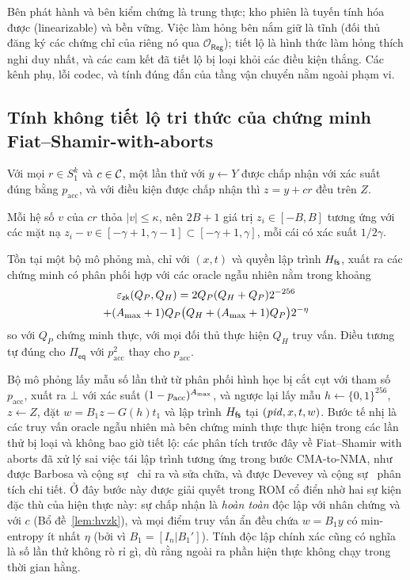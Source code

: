 Bên phát hành và bên kiểm chứng là trung thực; kho phiên là tuyến tính hóa được
(linearizable) và bền vững. Việc làm hỏng bên nắm giữ là tĩnh (đối thủ đăng ký
các chứng chỉ của riêng nó qua $\mathcal O_{\mathsf{Reg}}$); tiết lộ là hình
thức làm hỏng thích nghi duy nhất, và các cam kết đã tiết lộ bị loại khỏi các
điều kiện thắng. Các kênh phụ, lỗi codec, và tính đúng đắn của tầng vận chuyển
nằm ngoài phạm vi.

\subsection{Tính không tiết lộ tri thức của chứng minh Fiat--Shamir-with-aborts}
\label{sec:sec-zk}

\begin{lemma}
\label{lem:hvzk}
Với mọi $r\in S_1^k$ và $c\in\mathcal{C}$, một lần thử với $y\leftarrow Y$ được chấp
nhận với xác suất đúng bằng $p_{\mathrm{acc}}$, và với điều kiện được chấp nhận
thì $z=y+cr$ đều trên $Z$.
\end{lemma}
\noindent
Mỗi hệ số $v$ của $cr$ thỏa $|v|\le\kappa$, nên $2B+1$ giá trị
$z_i\in[-B,B]$ tương ứng với các mặt nạ $z_i-v\in[-\gamma+1,\gamma-1]\subset
[-\gamma+1,\gamma]$, mỗi cái có xác suất $1/2\gamma$.

\begin{lemma}[Mô phỏng]
\label{lem:sim}
Tồn tại một bộ mô phỏng mà, chỉ với $(x,t)$ và quyền lập trình $H_{\mathsf{fs}}$, xuất ra
các chứng minh có phân phối hợp với các oracle ngẫu nhiên nằm trong khoảng
\begin{multline*}
\varepsilon_{\mathsf{zk}}(Q_P,Q_H)=2Q_P(Q_H+Q_P)2^{-256}\\
+(A_{\max}+1)Q_P\bigl(Q_H+(A_{\max}+1)Q_P\bigr)2^{-\eta}
\end{multline*}
so với $Q_P$ chứng minh thực, với mọi đối thủ thực hiện $Q_H$ truy vấn. Điều
tương tự đúng cho $\Pi_{\mathsf{eq}}$ với $p_{\mathrm{acc}}^2$ thay cho $p_{\mathrm{acc}}$.
\end{lemma}
\noindent
Bộ mô phỏng lấy mẫu số lần thử từ phân phối hình học bị cắt cụt với tham số
$p_{\mathrm{acc}}$, xuất ra $\bot$ với xác suất $(1-p_{\mathrm{acc}})^{A_{\max}}$,
và ngược lại lấy mẫu $h\leftarrow\{0,1\}^{256}$, $z\leftarrow Z$, đặt
$w=B_1z-G(h)t_1$ và lập trình $H_{\mathsf{fs}}$ tại $(\mathit{pid},x,t,w)$. Bước tế nhị là các truy
vấn oracle ngẫu nhiên mà bên chứng minh thực thực hiện trong các lần thử bị loại
và không bao giờ tiết lộ: các phân tích trước đây về Fiat--Shamir with aborts đã
xử lý sai việc tái lập trình tương ứng trong bước CMA-to-NMA, như được Barbosa
và cộng sự~\cite{ref:barbosa} chỉ ra và sửa chữa, và được Devevey và cộng
sự~\cite{ref:devevey} phân tích chi tiết. Ở đây bước này được giải quyết trong
ROM cổ điển nhờ hai sự kiện đặc thù của hiện thực này: sự chấp nhận là
\emph{hoàn toàn} độc lập với nhân chứng và với $c$ (Bổ đề~\ref{lem:hvzk}), và
mọi điểm truy vấn ẩn đều chứa $w=B_1y$ có min-entropy ít nhất $\eta$ (bởi vì
$B_1=[I_n|B_1']$). Tính độc lập chính xác cũng có nghĩa là số lần thử không rò
rỉ gì, dù rằng ngoài ra phần hiện thực không chạy trong thời gian hằng.

